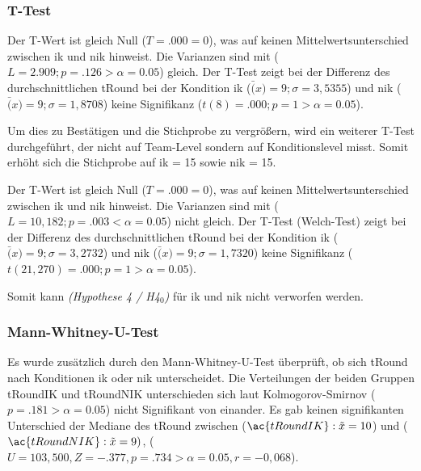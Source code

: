 \documentclass[a4paper,11pt]{article}%
\renewcommand{\\}{\vspace*{0.5\baselineskip} \newline}
\begin{document}
		\subsubsection{T-Test}
Der T-Wert ist gleich Null ($T = .000 = 0$), was auf keinen Mittelwertsunterschied zwischen \ac{ik} und \ac{nik} hinweist.
Die Varianzen sind mit ($L= 2.909; p = .126 > \alpha = 0.05$) gleich.
Der T-Test zeigt bei der Differenz des durchschnittlichen \ac{tRound} bei der Kondition \ac{ik} ($\bar(x) = 9; \sigma = 3,5355$) und \ac{nik} ($\bar(x) = 9; \sigma = 1,8708$) keine Signifikanz ($t(8) = .000; p = 1 > \alpha = 0.05$).\\


Um dies zu Bestätigen und die Stichprobe zu vergrößern, wird ein weiterer T-Test durchgeführt, der nicht auf Team-Level sondern auf Konditionslevel misst. Somit erhöht sich die Stichprobe auf \ac{ik} = 15 sowie \ac{nik} = 15.

Der T-Wert ist gleich Null ($T = .000 = 0$), was auf keinen Mittelwertsunterschied zwischen \ac{ik} und \ac{nik} hinweist.
Die Varianzen sind mit ($L= 10,182; p = .003 < \alpha = 0.05$) nicht gleich.
Der T-Test (Welch-Test) zeigt bei der Differenz des durchschnittlichen \ac{tRound} bei der Kondition \ac{ik} ($\bar(x) = 9; \sigma = 3,2732$) und \ac{nik} ($\bar(x) = 9; \sigma = 1,7320$) keine Signifikanz ($t(21,270) = .000; p = 1 > \alpha = 0.05$).\\

Somit kann \textit{(Hypothese 4 / H4$_{0}$)} für \ac{ik} und \ac{nik} nicht verworfen werden.

\subsubsection{Mann-Whitney-U-Test}
Es wurde zusätzlich durch den Mann-Whitney-U-Test überprüft, ob sich \ac{tRound} nach Konditionen \ac{ik} oder \ac{nik} unterscheidet. Die Verteilungen der beiden Gruppen \ac{tRoundIK} und \ac{tRoundNIK} unterschieden sich laut Kolmogorov-Smirnov ($p = .181 > \alpha = 0.05$) nicht Signifikant von einander. Es gab keinen signifikanten Unterschied der Mediane des \ac{tRound} zwischen ($\ac{tRoundIK} : \tilde x = 10$) und ($\ac{tRoundNIK} : \tilde x = 9)$, ($U = 103,500, Z = -.377, p = .734 > \alpha = 0.05, r = -0,068$). \\
\end{document}
